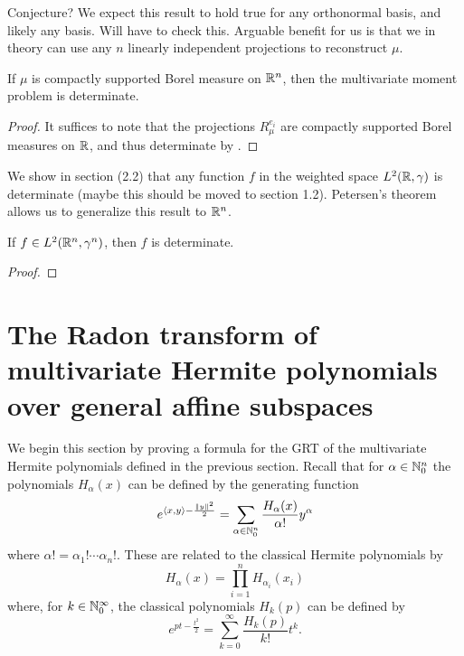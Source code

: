 \begin{remark}
  Conjecture? We expect this result to hold true for any orthonormal basis, and likely any basis. Will have to check this. Arguable benefit for us is that we in theory can use any $n$ linearly independent projections to reconstruct $\mu$.
\end{remark}

\begin{corollary}
  If $\mu$ is compactly supported Borel measure on $\mathbb{R}^n$, then the multivariate moment problem is determinate.
\end{corollary}

\begin{proof}
  It suffices to note that the projections $R_\mu^{e_i}$ are compactly supported Borel measures on $\mathbb{R}$, and thus determinate by \cn.
\end{proof}


We show in section (2.2) that any function $f$ in the weighted space $L^2(\mathbb{R}, \gamma)$ is determinate (maybe this should be moved to section 1.2). Petersen's theorem allows us to generalize this result to $\mathbb{R}^n$.

\begin{corollary}
  If $f \in L^2(\mathbb{R}^n, \gamma^n)$, then $f$ is determinate.
\end{corollary}

\begin{proof}
  \pn
\end{proof}

\section{The Radon transform of multivariate Hermite polynomials over general affine subspaces}

We begin this section by proving a formula for the GRT of the multivariate Hermite polynomials defined in the previous section. Recall that for $\alpha \in \mathbb{N}_0^n$ the polynomials $H_\alpha(x)$ can be defined by the generating function
\[
  e^{\langle x, y\rangle - \frac{\|y\|^2}2} = \sum_{\alpha \in \mathbb{N}_0^n} \frac{H_\alpha(x)}{\alpha!} y^\alpha
\]
where $\alpha! = \alpha_1! \cdots \alpha_n!$. These are related to the classical Hermite polynomials by
\[
  H_\alpha(x) = \prod_{i=1}^n H_{\alpha_i}(x_i)
\]
where, for $k \in \mathbb{N}_0^\infty$, the classical polynomials $H_{k}(p)$ can be defined by
\[
  e^{pt - \frac{t^2}2} = \sum_{k = 0}^\infty \frac{H_k(p)}{k!}t^k.
\]

